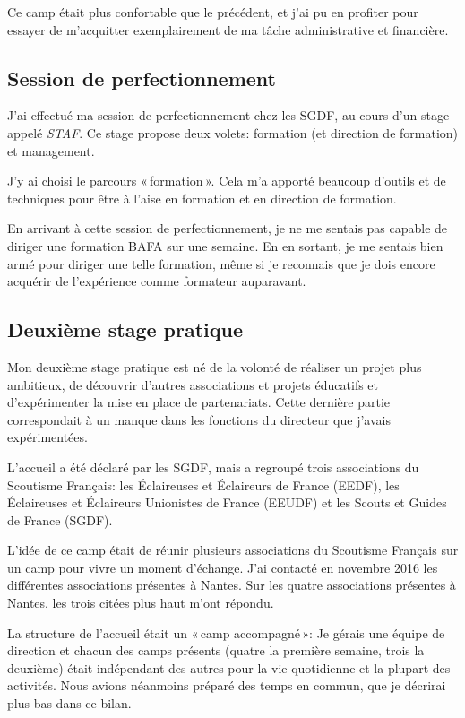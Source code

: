 \documentclass[titlepage,11pt,a4paper]{article}
\begin{document}
Ce camp était plus confortable que le précédent, et j'ai pu en profiter pour essayer
de m'acquitter exemplairement de ma tâche administrative et financière.

\subsection{Session de perfectionnement}

J'ai effectué ma session de perfectionnement chez les SGDF, au cours d'un stage appelé
\emph{STAF}. Ce stage propose deux volets: formation (et direction de formation) et
management.

J'y ai choisi le parcours «\,formation\,». Cela m'a apporté beaucoup d'outils et de
techniques pour être à l'aise en formation et en direction de formation.

En arrivant à cette session de perfectionnement, je ne me sentais pas capable de diriger une
formation BAFA sur une semaine. En en sortant, je me sentais bien armé pour diriger une
telle formation, même si je reconnais que je dois encore acquérir de l'expérience comme
formateur auparavant.

\subsection{Deuxième stage pratique}

Mon deuxième stage pratique est né de la volonté de réaliser un projet plus ambitieux, de
découvrir d'autres associations et projets éducatifs et d'expérimenter la mise en place de
partenariats. Cette dernière partie correspondait à un manque dans les fonctions du
directeur que j'avais expérimentées.

L'accueil a été déclaré par les SGDF, mais a regroupé trois associations du Scoutisme
Français: les Éclaireuses et Éclaireurs de France (EEDF), les Éclaireuses et Éclaireurs
Unionistes de France (EEUDF) et les Scouts et Guides de France (SGDF).

L'idée de ce camp était de réunir plusieurs associations du Scoutisme Français sur un camp
pour vivre un moment d'échange. J'ai contacté
en novembre 2016 les différentes associations présentes à Nantes. Sur les quatre associations
présentes à Nantes, les trois citées plus haut m'ont répondu.


La structure de l'accueil était un «\,camp accompagné\,»: Je gérais une équipe de
direction et chacun des camps présents (quatre la première semaine, trois la deuxième)
était indépendant des autres pour la vie quotidienne et la plupart des activités. Nous
avions néanmoins préparé des temps en commun, que je décrirai plus bas dans ce bilan.
\end{document}
